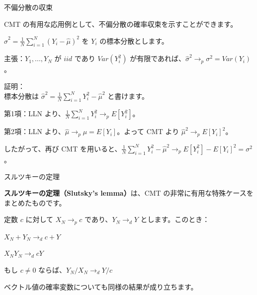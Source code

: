 \documentclass[11pt,handout]{beamer}
\newenvironment{wideitemize}{\itemize\addtolength{\itemsep}{10pt}}{\enditemize}
\begin{document}
\begin{frame}{不偏分散の収束}
\begin{wideitemize}
\item
CMT の有用な応用例として、不偏分散の確率収束を示すことができます。

\pause
\item
$\hat\sigma^2 = \frac{1}{N} \sum_{i=1}^N (Y_i - \hat\mu)^2$ を $Y_i$ の標本分散とします。

\pause
\item
主張：$Y_1,...,Y_N$ が $iid$ であり $Var(Y_i^2)$ が有限であれば、$\hat\sigma^2 \rightarrow_p \sigma^2 = Var(Y_i)$。

\pause
\item
証明：\\

標本分散は $\hat\sigma^2 = \frac{1}{N} \sum_{i=1}^N Y_i^2 - \hat\mu^2$ と書けます。 \\ \vspace{.1cm} \pause

第1項：LLN より、$ \frac{1}{N} \sum_{i=1}^N Y_i^2 \rightarrow_p E[Y_i^2]$。 \\ \vspace{.1cm} \pause

第2項：LLN より、$\hat\mu \rightarrow_p \mu = E[Y_i]$。よって CMT より $\hat\mu^2 \rightarrow_p E[Y_i]^2$。\\ \vspace{.1cm} \pause

したがって、再び CMT を用いると、$\frac{1}{N} \sum_{i=1}^N Y_i^2 - \hat\mu^2 \rightarrow_p E[Y_i^2] - E[Y_i]^2 = \sigma^2$。

\end{wideitemize}		
\end{frame}

\begin{frame}{スルツキーの定理}

\begin{wideitemize}

\item
\textbf{スルツキーの定理（Slutsky's lemma）}は、CMT の非常に有用な特殊ケースをまとめたものです。

\pause
\item
定数 $c$ に対して $X_N \rightarrow_p c$ であり、$Y_N \rightarrow_d Y$ とします。このとき：

\item
$X_N + Y_N \rightarrow_d c + Y$ \pause

\item
$X_N Y_N \rightarrow_d c Y$ \pause

\item
もし $c \neq 0$ ならば、$Y_N/ X_N \rightarrow_d Y /c$ 

\pause
\item
ベクトル値の確率変数についても同様の結果が成り立ちます。
\end{wideitemize}
	
\end{frame}
\end{document}
